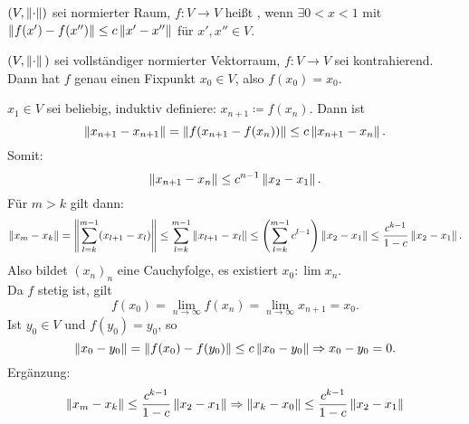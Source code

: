 \begin{definition}
	$ (V,\left\|\cdot\right\|) $ sei normierter Raum, $ f\colon V\rightarrow V $ hei\ss t , wenn $ \exists 0<x<1 $ mit $ \left\|f(x')-f(x'')\right\|\leq c\left\|x'-x''\right\| $ f\"ur $ x',x''\in V $.
\end{definition}
\begin{satz}
	$ (V,\left\|\cdot\right\|{}) $ sei vollst\"andiger normierter Vektorraum, $ f\colon V\rightarrow V $ sei kontrahierend. Dann hat $ f $ genau einen Fixpunkt $ x_0\in V $, also $ f(x_0)=x_0 $.
\end{satz}
\begin{beweis}
	$ x_1\in V $ sei beliebig, induktiv definiere: $ x_{n+1}\coloneqq f(x_n) $. Dann ist \[ \left\|x_{n+1}-x_{n+1}\right\|=\left\|f(x_{n+1}-f(x_n))\right\|\leq c\left\|x_{n+1}-x_n\right\|. \]
	Somit: 
	\[ \left\|x_{n+1}-x_n\right\|\leq c^{n-1}\left\|x_2-x_1\right\|. \]
	F\"ur $ m>k $ gilt dann:
	\[ \left\|x_m-x_k\right\|=\left\|\sum_{l=k}^{m-1}(x_{l+1}-x_l)\right\|\leq\sum_{l=k}^{m-1}\left\|x_{l+1}-x_l\right\|\leq\left(\sum_{l=k}^{m-1}c^{l-1}\right)\left\|x_2-x_1\right\|\leq\frac{c^{k-1}}{1-c}\left\|x_2-x_1\right\|. \]
	Also bildet $ (x_n)_n $ eine Cauchyfolge, es existiert $ x_0\colon\lim x_n $.\\
	Da $ f $ stetig ist, gilt \[ f(x_0)=\lim_{n\to\infty} f(x_n)=\lim_{n\to\infty}x_{n+1}=x_0. \]
	Ist $ y_0\in V $ und $ f(y_0)=y_0 $, so
	\[ \left\|x_0-y_0\right\|=\left\|f(x_0)-f(y_0)\right\|\leq c\left\|x_0-y_0\right\|\Rightarrow x_0-y_0=0. \]
	Erg\"anzung:
	\[ \left\|x_m-x_k\right\|\leq\frac{c^{k-1}}{1-c}\left\|x_2-x_1\right\|\Rightarrow \left\|x_k-x_0\right\|\leq\frac{c^{k-1}}{1-c}\left\|x_2-x_1\right\| \]
\end{beweis}
